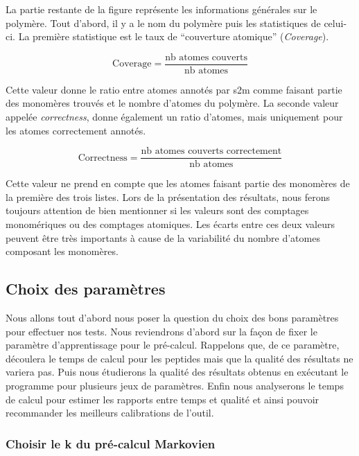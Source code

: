La partie restante de la figure représente les informations générales sur le polymère.
Tout d'abord, il y a le nom du polymère puis les statistiques de celui-ci.
La première statistique est le taux de ``couverture atomique'' (\textit{Coverage}).

\begin{equation}
  \text{Coverage} = \frac{\text{nb atomes couverts}}{\text{nb atomes}}
\end{equation}


Cette valeur donne le ratio entre atomes annotés par s2m comme faisant partie des monomères trouvés et le nombre d'atomes du polymère.
La seconde valeur appelée \textit{correctness}, donne également un ratio d'atomes, mais uniquement pour les atomes correctement annotés.

\begin{equation}
  \text{Correctness} = \frac{\text{nb atomes couverts correctement}}{\text{nb atomes}}
\end{equation}

Cette valeur ne prend en compte que les atomes faisant partie des monomères de la première des trois listes.
Lors de la présentation des résultats, nous ferons toujours attention de bien mentionner si les valeurs sont des comptages monomériques ou des comptages atomiques.
Les écarts entre ces deux valeurs peuvent être très importants à cause de la variabilité du nombre d'atomes composant les monomères.





\subsection{Choix des paramètres}

\label{parameters_choice}

Nous allons tout d'abord nous poser la question du choix des bons paramètres pour effectuer nos tests.
Nous reviendrons d'abord sur la façon de fixer le paramètre d'apprentissage pour le pré-calcul.
Rappelons que, de ce paramètre, découlera le temps de calcul pour les peptides mais que la qualité des résultats ne variera pas.
Puis nous étudierons la qualité des résultats obtenus en exécutant le programme pour plusieurs jeux de paramètres.
Enfin nous analyserons le temps de calcul pour estimer les rapports entre temps et qualité et ainsi pouvoir recommander les meilleurs calibrations de l'outil.

\subsubsection{Choisir le k du pré-calcul Markovien}
\label{k_res}


